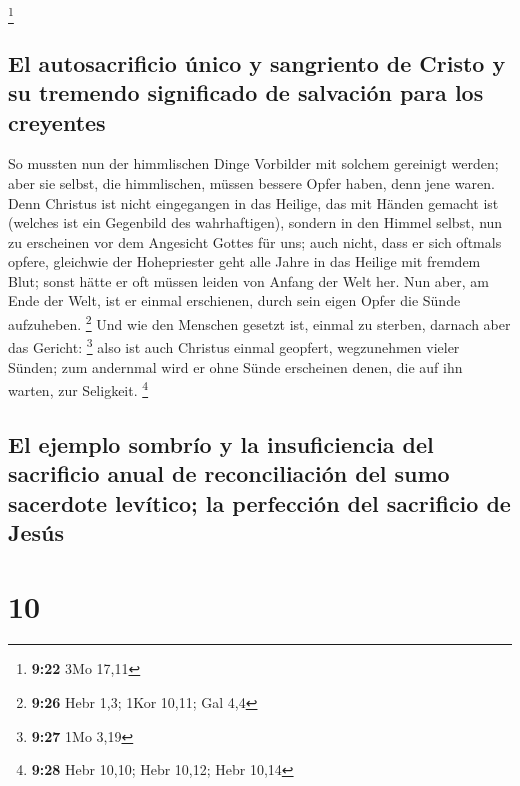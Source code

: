 \footnote{\textbf{9:22} 3Mo 17,11}

\hypertarget{el-autosacrificio-uxfanico-y-sangriento-de-cristo-y-su-tremendo-significado-de-salvaciuxf3n-para-los-creyentes}{%
\subsection{El autosacrificio único y sangriento de Cristo y su tremendo
significado de salvación para los
creyentes}\label{el-autosacrificio-uxfanico-y-sangriento-de-cristo-y-su-tremendo-significado-de-salvaciuxf3n-para-los-creyentes}}

 So mussten nun der himmlischen Dinge Vorbilder mit
solchem gereinigt werden; aber sie selbst, die himmlischen, müssen
bessere Opfer haben, denn jene waren.  Denn Christus ist
nicht eingegangen in das Heilige, das mit Händen gemacht ist (welches
ist ein Gegenbild des wahrhaftigen), sondern in den Himmel selbst, nun
zu erscheinen vor dem Angesicht Gottes für uns;  auch
nicht, dass er sich oftmals opfere, gleichwie der Hohepriester geht alle
Jahre in das Heilige mit fremdem Blut;  sonst hätte er
oft müssen leiden von Anfang der Welt her. Nun aber, am Ende der Welt,
ist er einmal erschienen, durch sein eigen Opfer die Sünde aufzuheben.
\footnote{\textbf{9:26} Hebr 1,3; 1Kor 10,11; Gal 4,4} 
Und wie den Menschen gesetzt ist, einmal zu sterben, darnach aber das
Gericht: \footnote{\textbf{9:27} 1Mo 3,19}  also ist auch
Christus einmal geopfert, wegzunehmen vieler Sünden; zum andernmal wird
er ohne Sünde erscheinen denen, die auf ihn warten, zur Seligkeit.
\footnote{\textbf{9:28} Hebr 10,10; Hebr 10,12; Hebr 10,14}

\hypertarget{el-ejemplo-sombruxedo-y-la-insuficiencia-del-sacrificio-anual-de-reconciliaciuxf3n-del-sumo-sacerdote-levuxedtico-la-perfecciuxf3n-del-sacrificio-de-jesuxfas}{%
\subsection{El ejemplo sombrío y la insuficiencia del sacrificio anual
de reconciliación del sumo sacerdote levítico; la perfección del
sacrificio de
Jesús}\label{el-ejemplo-sombruxedo-y-la-insuficiencia-del-sacrificio-anual-de-reconciliaciuxf3n-del-sumo-sacerdote-levuxedtico-la-perfecciuxf3n-del-sacrificio-de-jesuxfas}}

\hypertarget{section-9}{%
\section{10}\label{section-9}}

